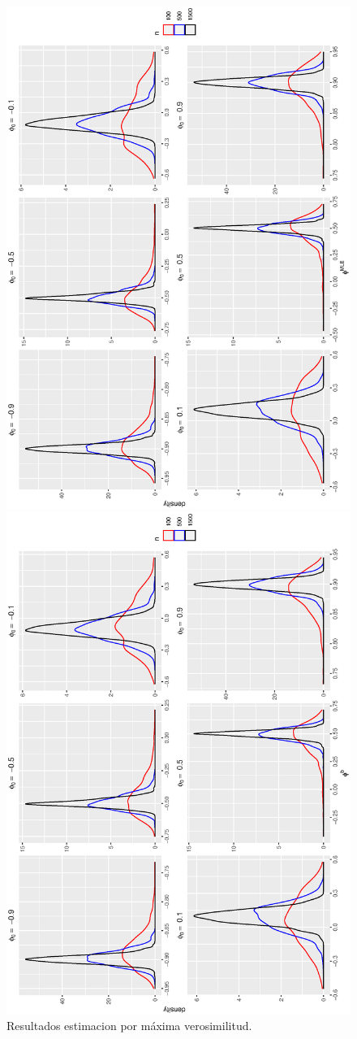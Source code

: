 \begin{figure}[h]
    \begin{minipage}{0.45\textwidth}
    \includegraphics[width=0.8\linewidth,angle = 270]{Kap3/Fig_Cap3/sim3.eps}
    \caption{Resultados estimacion por máxima verosimilitud.}
    \label{fig:monte_carlo_res1}
    \end{minipage}
    \hfill
    \begin{minipage}{0.45\textwidth}
    \includegraphics[width=0.8\linewidth,angle = 270]{Kap3/Fig_Cap3/sim4.eps}

\end{minipage}
\end{figure}
